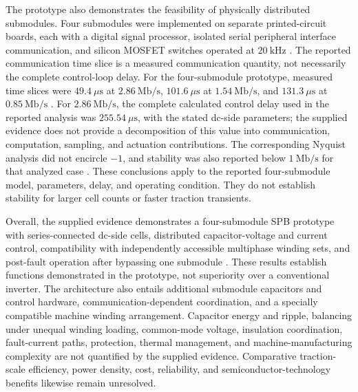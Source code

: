 The prototype also demonstrates the feasibility of physically distributed submodules. Four submodules were implemented on separate printed-circuit boards, each with a digital signal processor, isolated serial peripheral interface communication, and silicon MOSFET switches operated at \(20~\mathrm{kHz}\) \cite{Jin2017}. The reported communication time slice is a measured communication quantity, not necessarily the complete control-loop delay. For the four-submodule prototype, measured time slices were \(49.4~\mu\mathrm{s}\) at \(2.86~\mathrm{Mb/s}\), \(101.6~\mu\mathrm{s}\) at \(1.54~\mathrm{Mb/s}\), and \(131.3~\mu\mathrm{s}\) at \(0.85~\mathrm{Mb/s}\) \cite{Jin2017}. For \(2.86~\mathrm{Mb/s}\), the complete calculated control delay used in the reported analysis was \(255.54~\mu\mathrm{s}\), with the stated dc-side parameters; the supplied evidence does not provide a decomposition of this value into communication, computation, sampling, and actuation contributions. The corresponding Nyquist analysis did not encircle \(-1\), and stability was also reported below \(1~\mathrm{Mb/s}\) for that analyzed case \cite{Jin2017}. These conclusions apply to the reported four-submodule model, parameters, delay, and operating condition. They do not establish stability for larger cell counts or faster traction transients. %

Overall, the supplied evidence demonstrates a four-submodule SPB prototype with series-connected dc-side cells, distributed capacitor-voltage and current control, compatibility with independently accessible multiphase winding sets, and post-fault operation after bypassing one submodule \cite{Jin2017}. These results establish functions demonstrated in the prototype, not superiority over a conventional inverter. The architecture also entails additional submodule capacitors and control hardware, communication-dependent coordination, and a specially compatible machine winding arrangement. Capacitor energy and ripple, balancing under unequal winding loading, common-mode voltage, insulation coordination, fault-current paths, protection, thermal management, and machine-manufacturing complexity are not quantified by the supplied evidence. Comparative traction-scale efficiency, power density, cost, reliability, and semiconductor-technology benefits likewise remain unresolved. %